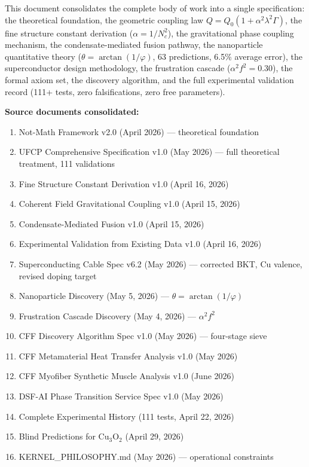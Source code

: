 \documentclass[11pt, a4paper]{article}
\begin{document}
This document consolidates the complete body of work into a single
specification: the theoretical foundation, the geometric coupling law
$Q = Q_0(1 + \alpha^2\lambda^2\Gamma)$, the fine structure constant
derivation ($\alpha = 1/N_c^2$), the gravitational phase coupling
mechanism, the condensate-mediated fusion pathway, the nanoparticle
quantitative theory ($\theta = \arctan(1/\varphi)$, 63 predictions,
6.5\% average error), the superconductor design methodology, the
frustration cascade ($\alpha^2 f^2 = 0.30$), the formal axiom set,
the discovery algorithm, and the full experimental validation record
(111+ tests, zero falsifications, zero free parameters).

\textbf{Source documents consolidated:}
\begin{enumerate}[nosep]
  \item Not-Math Framework v2.0 (April 2026) --- theoretical foundation
  \item UFCP Comprehensive Specification v1.0 (May 2026) --- full
    theoretical treatment, 111 validations
  \item Fine Structure Constant Derivation v1.0 (April 16, 2026)
  \item Coherent Field Gravitational Coupling v1.0 (April 15, 2026)
  \item Condensate-Mediated Fusion v1.0 (April 15, 2026)
  \item Experimental Validation from Existing Data v1.0 (April 16, 2026)
  \item Superconducting Cable Spec v6.2 (May 2026) --- corrected BKT,
    Cu valence, revised doping target
  \item Nanoparticle Discovery (May 5, 2026) --- $\theta = \arctan(1/\varphi)$
  \item Frustration Cascade Discovery (May 4, 2026) --- $\alpha^2 f^2$
  \item CFF Discovery Algorithm Spec v1.0 (May 2026) --- four-stage sieve
  \item CFF Metamaterial Heat Transfer Analysis v1.0 (May 2026)
  \item CFF Myofiber Synthetic Muscle Analysis v1.0 (June 2026)
  \item DSF-AI Phase Transition Service Spec v1.0 (May 2026)
  \item Complete Experimental History (111 tests, April 22, 2026)
  \item Blind Predictions for Cu$_3$O$_2$ (April 29, 2026)
  \item KERNEL\_PHILOSOPHY.md (May 2026) --- operational constraints
\end{enumerate}
\end{document}

